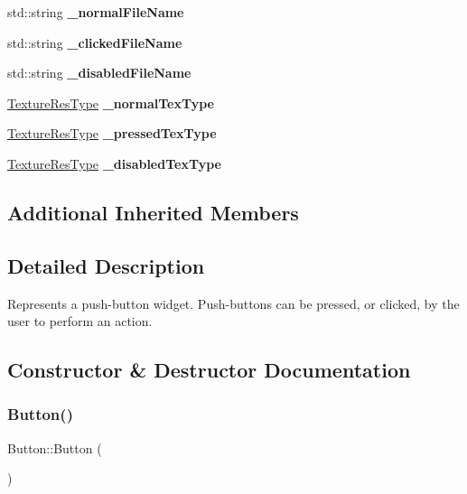\begin{DoxyCompactItemize}
std\+::string {\bfseries \+\_\+normal\+File\+Name}
\item 
\mbox{\label{classui_1_1Button_af703ee2640e5464fe95ee32a022b070b}} 
std\+::string {\bfseries \+\_\+clicked\+File\+Name}
\item 
\mbox{\label{classui_1_1Button_a33c89519cffbf2801679844ead7aee8b}} 
std\+::string {\bfseries \+\_\+disabled\+File\+Name}
\item 
\mbox{\label{classui_1_1Button_a33d5f7f5de9fe7084bacfbdcdf3ed11c}} 
\hyperlink{classui_1_1Widget_a040a65ec5ad3b11119b7e16b98bd9af0}{Texture\+Res\+Type} {\bfseries \+\_\+normal\+Tex\+Type}
\item 
\mbox{\label{classui_1_1Button_a07cfd747b8c342cec80cddc6bb50a1b8}} 
\hyperlink{classui_1_1Widget_a040a65ec5ad3b11119b7e16b98bd9af0}{Texture\+Res\+Type} {\bfseries \+\_\+pressed\+Tex\+Type}
\item 
\mbox{\label{classui_1_1Button_a03a7bf329449b21f5b738c09cbb2ce0f}} 
\hyperlink{classui_1_1Widget_a040a65ec5ad3b11119b7e16b98bd9af0}{Texture\+Res\+Type} {\bfseries \+\_\+disabled\+Tex\+Type}
\end{DoxyCompactItemize}
\subsection*{Additional Inherited Members}


\subsection{Detailed Description}
Represents a push-\/button widget. Push-\/buttons can be pressed, or clicked, by the user to perform an action. 

\subsection{Constructor \& Destructor Documentation}
\mbox{\label{classui_1_1Button_a3b36df1ae23c58aedb9e15a713159459}} 
\subsubsection{\texorpdfstring{Button()}{Button()}\hspace{0.1cm}{\footnotesize\ttfamily [1/2]}}
{\footnotesize\ttfamily Button\+::\+Button (\begin{DoxyParamCaption}{ }\end{DoxyParamCaption})}

